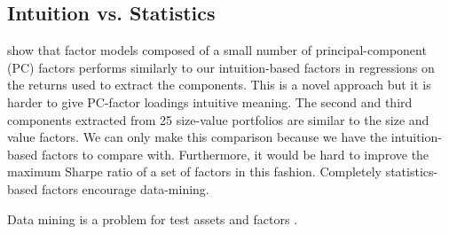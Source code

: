 
\subsection{Intuition vs. Statistics}

\textcite{kozak2017interpreting} show that factor models composed of a small number of
principal-component (PC) factors performs similarly to our intuition-based factors in
regressions on the returns used to extract the components. This is a novel approach but it
is harder to give PC-factor loadings intuitive meaning. The second and third components
extracted from 25  size-value portfolios are similar to the size and value factors. We can
only make this comparison because we have the intuition-based factors to compare with.
Furthermore, it would be hard to improve the maximum Sharpe ratio of a set of factors in
this  fashion. Completely statistics-based factors encourage data-mining.

Data mining is a problem for test assets \parencite{lewellen2010skeptical} and factors 
\parencite{harvey2016and}.

